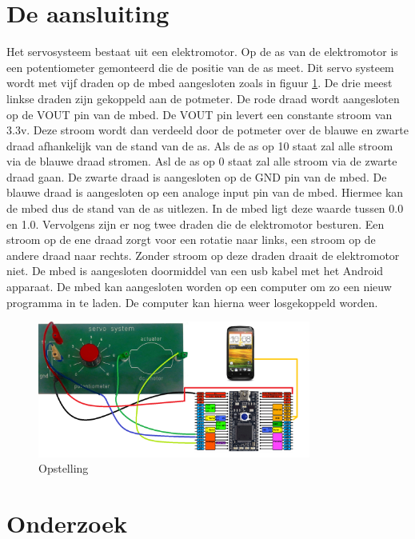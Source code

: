 \documentclass[a4paper]{article}
\begin{document}
	\section{De aansluiting}
		Het servosysteem bestaat uit een elektromotor. Op de as van de elektromotor is een potentiometer gemonteerd die de positie van de as meet. Dit servo systeem wordt met vijf draden op de mbed aangesloten zoals in figuur \ref{fig:opstelling}.
De drie meest linkse draden zijn gekoppeld aan de potmeter. De rode draad wordt aangesloten op de VOUT pin van de mbed. De VOUT pin levert een constante stroom van 3.3v. Deze stroom wordt dan verdeeld door de potmeter over de blauwe en zwarte draad afhankelijk van de stand van de as. Als de as op 10 staat zal alle stroom via de blauwe draad stromen. Asl de as op 0 staat zal alle stroom via de zwarte draad gaan. De zwarte draad is aangesloten op de GND pin van de mbed. De blauwe draad is aangesloten op een analoge input pin van de mbed. Hiermee kan de mbed dus de stand van de as uitlezen. In de mbed ligt deze waarde tussen 0.0 en 1.0. Vervolgens zijn er nog twee draden die de elektromotor besturen. Een stroom op de ene draad zorgt voor een rotatie naar links, een stroom op de andere draad naar rechts. Zonder stroom op deze draden draait de elektromotor niet. De mbed is aangesloten doormiddel van een usb kabel met het Android apparaat. De mbed kan aangesloten worden op een computer om zo een nieuw programma in te laden. De computer kan hierna weer losgekoppeld worden.
	\begin{figure}[h]
		\centering
		\includegraphics[width=0.8\textwidth]{imgs/opstelling.png}
		\caption{Opstelling}
		\label{fig:opstelling}
	\end{figure}
		\newpage
	\section{Onderzoek}
\end{document}
